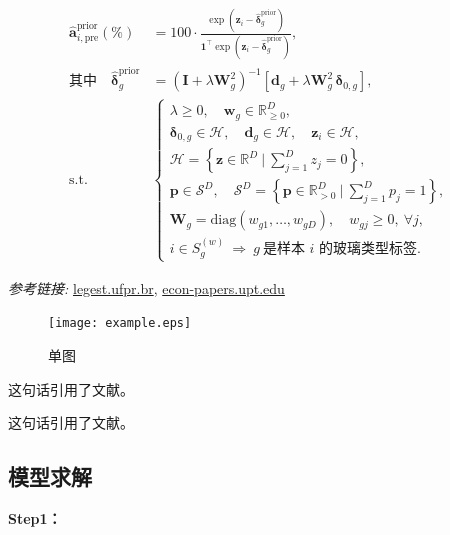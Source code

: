 \documentclass[withoutpreface,bwprint]{cumcmthesis}
\begin{document}
\begin{align}
\widehat{\mathbf{a}}_{i,\mathrm{pre}}^{\mathrm{prior}} (\%)
&= 100 \cdot 
\frac{\exp\!\left( \mathbf{z}_i - \widehat{\boldsymbol\delta}_g^{\mathrm{prior}} \right)}
{\mathbf{1}^\top \exp\!\left( \mathbf{z}_i - \widehat{\boldsymbol\delta}_g^{\mathrm{prior}} \right)},
\\
\text{其中} \quad
\widehat{\boldsymbol\delta}_g^{\mathrm{prior}}
&= \left( \mathbf{I} + \lambda \mathbf{W}_g^2 \right)^{-1} 
\left[ \mathbf{d}_g + \lambda \mathbf{W}_g^2 \, \boldsymbol{\delta}_{0,g} \right],
\\
\text{s.t.} \quad &
\begin{cases}
\lambda \ge 0, \quad \mathbf{w}_g \in \mathbb{R}_{\ge 0}^D, \\[0.3em]
\boldsymbol{\delta}_{0,g} \in \mathcal{H}, \quad \mathbf{d}_g \in \mathcal{H}, \quad \mathbf{z}_i \in \mathcal{H}, \\[0.3em]
\mathcal{H} = \left\{ \mathbf{z} \in \mathbb{R}^D \ \bigg| \ \sum_{j=1}^D z_j = 0 \right\}, \\[0.3em]
\mathbf{p} \in \mathcal{S}^D, \quad 
\mathcal{S}^D = \left\{ \mathbf{p} \in \mathbb{R}_{>0}^D \ \bigg| \ \sum_{j=1}^D p_j = 1 \right\}, \\[0.3em]
\mathbf{W}_g = \mathrm{diag}(w_{g1}, \dots, w_{gD}), \quad w_{gj} \ge 0, \ \forall j, \\[0.3em]
i \in S_g^{(w)} \ \Rightarrow \ g \ \text{是样本 $i$ 的玻璃类型标签}.
\end{cases}
\end{align}




\smallskip
\noindent
\textit{参考链接:} \url{legest.ufpr.br}, \url{econ-papers.upt.edu}


\begin{figure}[ht]
\centering
\texttt{[image: example.eps]}
\caption{单图}
\label{fig:单图}
\end{figure}

这句话引用了文献\cite{司守奎2011数学建模算法与应用}。

这句话引用了文献。

\subsection{模型求解}

\textbf{Step1：} 
\end{document}
